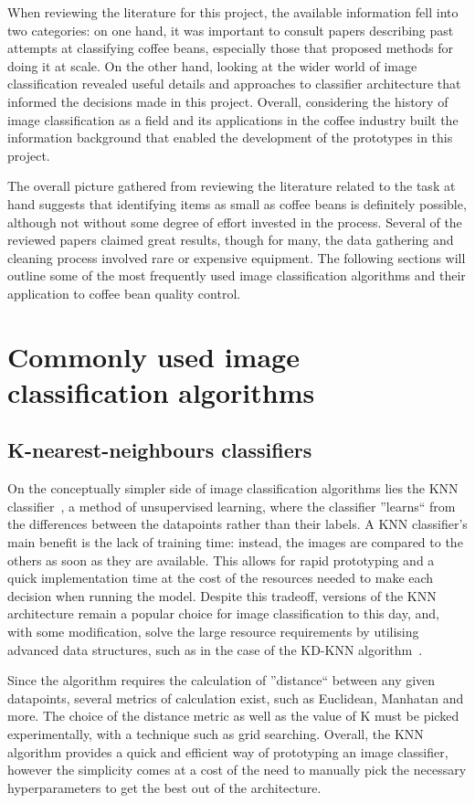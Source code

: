 When reviewing the literature for this project, the available information fell into
two categories: on one hand, it was important to consult papers describing past attempts
at classifying coffee beans, especially those that proposed methods for doing it
at scale.
On the other hand, looking at the wider world of image classification
revealed useful details and approaches to classifier architecture that informed
the decisions made in this project.
Overall, considering the history of image
classification as a field and its applications in the coffee industry built the
information background that enabled the development of the prototypes in this
project.

The overall picture gathered from reviewing the literature related to the task at hand
suggests that identifying items as small as coffee beans is definitely
possible, although not without some degree of effort invested in the process.
Several
of the reviewed papers claimed great results, though for many, the data gathering
and cleaning process involved rare or expensive equipment.
The following sections will outline some of the most frequently used image classification algorithms
and their application to coffee bean quality control.

\section{Commonly used image classification algorithms}
\label{sec:lit-review-general}
\subsection{K-nearest-neighbours classifiers}
On the conceptually simpler side of image classification algorithms lies the
KNN classifier~\cite{knnOverview}, a method of unsupervised learning, where the
classifier ''learns`` from the differences between the datapoints rather than
their labels.
A KNN classifier's main benefit is the lack of training time:
instead, the images are compared to the others as soon as they are available.
This allows for rapid prototyping and a quick implementation time at the cost of
the resources needed to make each decision when running the model.
Despite this tradeoff,
versions of the KNN architecture remain a popular choice for image
classification to this day, and, with some modification, solve the large resource
requirements by utilising advanced data structures, such as in the case of the
KD-KNN algorithm~\cite{kdtreeKNN}.

Since the algorithm requires the calculation of ''distance`` between any given
datapoints, several metrics of calculation exist, such as Euclidean, Manhatan and
more.
The choice of the distance metric as well as the value of K must be picked
experimentally, with a technique such as grid searching.
Overall, the KNN algorithm
provides a quick and efficient way of prototyping an image classifier, however
the simplicity comes at a cost of the need to manually pick the necessary
hyperparameters to get the best out of the architecture.

